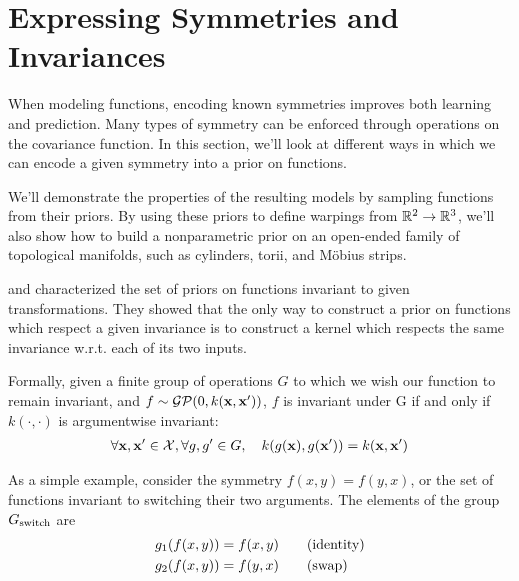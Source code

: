 \section{Expressing Symmetries and Invariances}

When modeling functions, encoding known symmetries improves both learning and prediction. 
Many types of symmetry can be enforced through operations on the covariance function.
In this section, we'll look at different ways in which we can encode a given symmetry into a prior on functions.

We'll demonstrate the properties of the resulting models by sampling functions from their priors.
By using these priors to define warpings from $\mathbb{R}^2 \to \mathbb{R}^3$, we'll also show how to build a nonparametric prior on an open-ended family of topological manifolds, such as cylinders, torii, and M\"{o}bius strips.


\citet{ginsbourger2012argumentwise} and \citet{Invariances13} characterized the set of \gp{} priors on functions invariant to given transformations.
They showed that the only way to construct a prior on functions which respect a given invariance is to construct a kernel which respects the same invariance w.r.t. each of its two inputs.

Formally, given a finite group of operations $G$ to which we wish our function to remain invariant, and $f \sim \mathcal{GP}\!\left(0,k({\bf{x}},{\bf{x}}')\right)$, $f$ is invariant under G if and only if $k(\cdot, \cdot)$ is argumentwise invariant:
%
\begin{align}
\forall {\bf{x}}, {\bf{x}}' \in \mathcal{X}, \forall g, g' \in G, \quad k( g({\bf{x}}), g({\bf{x}}')) = k({\bf{x}}, {\bf{x}}')
\end{align}

\def\gswitch{G_\textnormal{switch}}

As a simple example, consider the symmetry $f(x, y) = f(y,x)$, or the set of functions invariant to switching their two arguments.
The elements of the group $\gswitch$ are
%
\begin{align}
g_1(f(x,y)) & = f(x,y) \qquad \textnormal{(identity)}\\
g_2(f(x,y)) & = f(y,x) \qquad \textnormal{(swap)}
\end{align}

